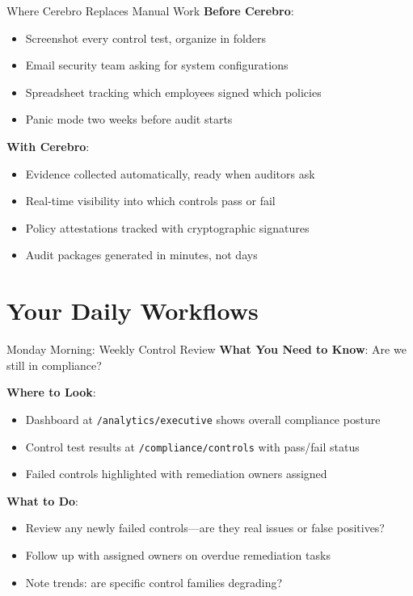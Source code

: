 \documentclass[aspectratio=169]{beamer}
\begin{document}
\begin{frame}{Where Cerebro Replaces Manual Work}
  \textbf{Before Cerebro}:
  \begin{itemize}
    \item Screenshot every control test, organize in folders
    \item Email security team asking for system configurations
    \item Spreadsheet tracking which employees signed which policies
    \item Panic mode two weeks before audit starts
  \end{itemize}
  
  \vspace{0.5cm}
  
  \textbf{With Cerebro}:
  \begin{itemize}
    \item Evidence collected automatically, ready when auditors ask
    \item Real-time visibility into which controls pass or fail
    \item Policy attestations tracked with cryptographic signatures
    \item Audit packages generated in minutes, not days
  \end{itemize}
\end{frame}

\section{Your Daily Workflows}

\begin{frame}{Monday Morning: Weekly Control Review}
  \textbf{What You Need to Know}: Are we still in compliance?
  
  \vspace{0.3cm}
  
  \textbf{Where to Look}:
  \begin{itemize}
    \item Dashboard at \texttt{/analytics/executive} shows overall compliance posture
    \item Control test results at \texttt{/compliance/controls} with pass/fail status
    \item Failed controls highlighted with remediation owners assigned
  \end{itemize}
  
  \vspace{0.3cm}
  
  \textbf{What to Do}:
  \begin{itemize}
    \item Review any newly failed controls—are they real issues or false positives?
    \item Follow up with assigned owners on overdue remediation tasks
    \item Note trends: are specific control families degrading?
  \end{itemize}
\end{frame}
\end{document}
